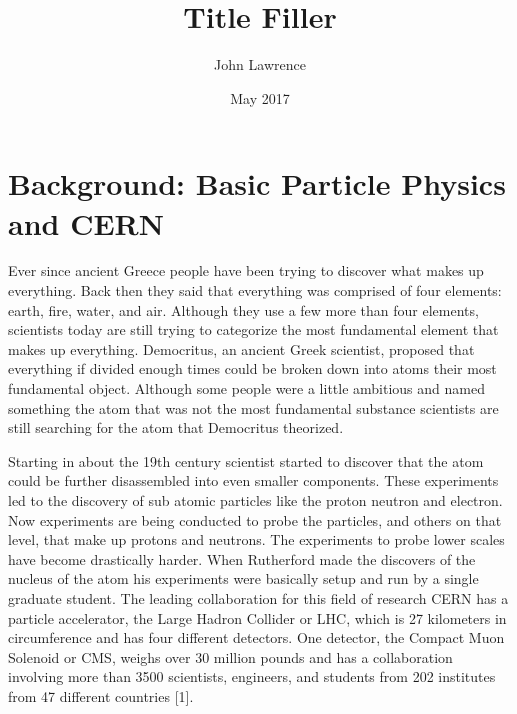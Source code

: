 \documentclass
[]
{thesis}
\title{Title Filler}
\author{John Lawrence}
\date{May 2017}
\begin{document}
	
\chapter{Background: Basic Particle Physics and CERN}
\label{chap:one}
	
Ever since ancient Greece people have been trying to discover what makes up everything. Back then they said that everything was comprised of four elements: earth, fire, water, and air. Although they use a few more than four elements, scientists today are still trying to categorize the most fundamental element that makes up everything. Democritus, an ancient Greek scientist, proposed that everything if divided enough times could be broken down into atoms their most fundamental object. Although some people were a little ambitious and named something the atom that was not the most fundamental substance scientists are still searching for the atom that Democritus theorized. 

Starting in about the 19th century scientist started to discover that the atom could be further disassembled into even smaller components. These experiments led to the discovery of sub atomic particles like the proton neutron and electron. Now experiments are being conducted to probe the particles, and others on that level, that make up protons and neutrons. The experiments to probe lower scales have become drastically harder. When Rutherford made the discovers of the nucleus of the atom his experiments were basically setup and run by a single graduate student. The leading collaboration for this field of research CERN has a particle accelerator, the Large Hadron Collider or LHC, which is 27 kilometers in circumference and has four different detectors. One detector, the Compact Muon Solenoid or CMS, weighs over 30 million pounds and has a collaboration involving more than 3500 scientists, engineers, and students from 202 institutes from 47 different countries [1]. 
\end{document}
